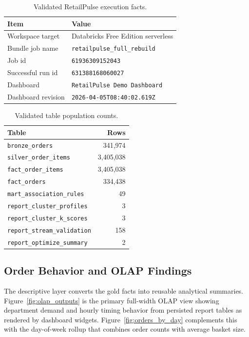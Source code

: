 \documentclass[journal]{IEEEtran}
\begin{document}
\begin{table}[!t]
\caption{Validated RetailPulse execution facts.}
\label{tab:run_facts}
\centering
\footnotesize
\begin{tabular}{p{2.9cm} p{4.7cm}}
\toprule
\textbf{Item} & \textbf{Value} \\
\midrule
Workspace target & Databricks Free Edition serverless \\
Bundle job name & \texttt{retailpulse\_full\_rebuild} \\
Job id & \texttt{61936309152043} \\
Successful run id & \texttt{631388168060027} \\
Dashboard & \texttt{RetailPulse Demo Dashboard} \\
Dashboard revision & \texttt{2026-04-05T08:40:02.619Z} \\
\bottomrule
\end{tabular}
\end{table}

\begin{table}[!t]
\caption{Validated table population counts.}
\label{tab:validated_counts}
\centering
\footnotesize
\begin{tabular}{p{4.8cm} r}
\toprule
\textbf{Table} & \textbf{Rows} \\
\midrule
\texttt{bronze\_orders} & 341,974 \\
\texttt{silver\_order\_items} & 3,405,038 \\
\texttt{fact\_order\_items} & 3,405,038 \\
\texttt{fact\_orders} & 334,438 \\
\texttt{mart\_association\_rules} & 49 \\
\texttt{report\_cluster\_profiles} & 3 \\
\texttt{report\_cluster\_k\_scores} & 3 \\
\texttt{report\_stream\_validation} & 158 \\
\texttt{report\_optimize\_summary} & 2 \\
\bottomrule
\end{tabular}
\end{table}

\subsection{Order Behavior and OLAP Findings}
The descriptive layer converts the gold facts into reusable analytical summaries. Figure~\ref{fig:olap_outputs} is the primary full-width OLAP view showing department demand and hourly timing behavior from persisted report tables as rendered by dashboard widgets. Figure~\ref{fig:orders_by_day} complements this with the day-of-week rollup that combines order counts with average basket size.
\end{document}
